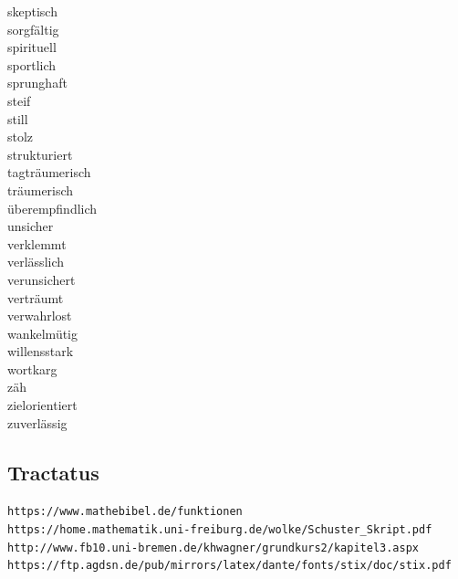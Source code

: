 \documentclass[10pt,a4paper]{article}
\begin{document}
skeptisch \\
sorgfältig \\
spirituell \\
sportlich \\
sprunghaft \\
steif \\
still \\
stolz \\
strukturiert \\
tagträumerisch \\
träumerisch \\
überempfindlich \\
unsicher \\
verklemmt \\
verlässlich \\
verunsichert \\
verträumt \\
verwahrlost \\
wankelmütig \\
willensstark \\
wortkarg \\
zäh \\
zielorientiert \\
zuverlässig


%

\nocite{*}

\printbibheading


\printbibliography[keyword=Bilder, heading=subbibliography,
  title={Bilderbücher}]


\printbibliography[keyword=Vorschule, heading=subbibliography,
  title={Vorschule}]


\printbibliography[keyword=Schule, heading=subbibliography,
  title={Schulbücher}]


\printbibliography[keyword=Evolution, heading=subbibliography,
  title={Evolution}]


\subsection{Tractatus}

\verb+https://www.mathebibel.de/funktionen+ \\
\verb+https://home.mathematik.uni-freiburg.de/wolke/Schuster_Skript.pdf+ \\
\verb+http://www.fb10.uni-bremen.de/khwagner/grundkurs2/kapitel3.aspx+ \\
\verb+https://ftp.agdsn.de/pub/mirrors/latex/dante/fonts/stix/doc/stix.pdf+
\end{document}

